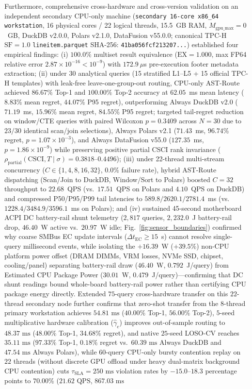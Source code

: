 \documentclass[10pt,a4paper]{article}
\begin{document}
Furthermore, comprehensive cross-hardware and cross-version validation on an independent secondary CPU-only machine (\texttt{secondary 16-core x86\_\allowbreak{}64 workstation}, 16 physical cores / 22 logical threads, 15.5~GB RAM, $M_{\text{gpu\_max}}=0$~GB, DuckDB v2.0.0, Polars v2.1.0, DataFusion v55.0.0; canonical TPC-H $\text{SF}=1.0$ \texttt{lineitem.parquet} SHA-256: \texttt{41ba056fcf213207...}) established four empirical findings: (i) $100.0\%$ multiset result equivalence ($\text{EX}=1.000$, max FP64 relative error $2.87\times 10^{-16} < 10^{-9}$) with $172.9~\mu$s pre-execution footer metadata extraction; (ii) under 30 analytical queries (15 stratified L1--L5 + 15 official TPC-H templates) with leak-free leave-one-group-out routing, CPU-only AST-Route achieved $86.67\%$ Top-1 and $100.00\%$ Top-2 accuracy at $62.05$~ms mean latency ($8.83\%$ mean regret, $44.07\%$ P95 regret), outperforming Always DuckDB v2.0 ($71.19$~ms, $15.96\%$ mean regret, $84.55\%$ P95 regret; targeted tail-regret reduction on window/CTE queries with paired Wilcoxon $p=0.3409$ across $N=30$ due to $23/30$ identical scan/join selections), Always Polars v2.1 ($71.43$~ms, $96.74\%$ regret, $p=1.07\times 10^{-3}$), and Always DataFusion v55.0 ($127.35$~ms, $p=1.86\times 10^{-9}$) while preserving positive partial CSCI rank invariance ($\rho_{\text{partial}}(\text{CSCI}, T \mid \sigma) = 0.3818\text{--}0.4496$); (iii) under 22-thread multi-stream concurrency ($C \in \{1,4,8,16,32\}$, $0.0\%$ failure rate), hybrid AST-Route dispatching (Scan/Join to DuckDB, Window/Sort to Polars) boosted $C=32$ throughput to $22.68$~QPS (vs.\ $17.51$~QPS on Polars and $4.10$~QPS on DuckDB) and compressed P50/P95/P99 tail latencies to $589.8/2620.1/2781.4$~ms (vs.\ $1228.4/3484.9/3596.1$~ms on Polars); and (iv) sustained 45-second motherboard ACPI DC battery-rail shunt telemetry ($2,817$ queries, $2,232.0$~J battery-rail drop, $46.40$~W active vs.\ $20.97$~W idle; Fig.~\ref{fig:sensor_boundaries}) confirmed why coarse SMBus EC update intervals ($\Delta t_{\text{EC}} \ge 15$~s) cannot resolve single-query millisecond events, while isolating the $+16.39$~W ($+39.5\%$) non-CPU platform power offset (DRAM DIMMs, VRM losses, NVMe SSD, chipset, cooling/panel) separating battery-rail draw ($46.40$~W, $0.792$~J/query) from Estimated CPU Package Power ($30.01$~W, $0.479$~J/query)---confirming that DC shunt readings bound whole-board battery-rail power rather than certifying CPU package energy directly. Extended $75$-query cross-hardware transfer on this $22$-thread secondary node further confirms that zero-shot transfer from the $8$-thread primary workstation achieves $54.81\text{ ms}$ ($40.00\%$ Top-1, $56.00\%$ Top-2), $5$-seed multiplicative hardware calibration ($\hat{\gamma}_e$) improves out-of-sample routing to $48.37\text{ ms}$ ($48.00\%$ Top-1, $34.68\%$ regret), and native $25$-seed LOSO-CV reaches $35.11\text{ ms}$ ($97.33\%$ Top-1, $0.18\%$ regret vs.\ $60.39\text{ ms}$ Always DuckDB and $47.54\text{ ms}$ Always Polars), while $60$-query CPU-only bursty contention replay on $22$ threads (without discrete GPU offload under heavy dual-matrix background CPU contention) cuts $\tau_{\text{SLA}}=250\text{ ms}$ violation rates by $-15.0\text{--}18.3$ percentage points to $70.00\%$ ($21.62\text{ QPS}$, $867.03\text{ ms}$ 
\end{document}
